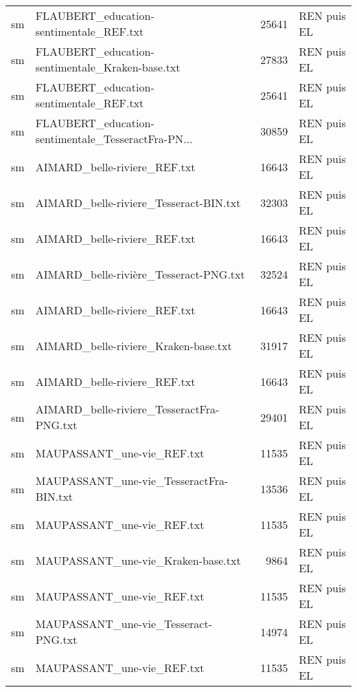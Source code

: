 \begin{tabular}{llrl}
    sm &            FLAUBERT\_education-sentimentale\_REF.txt &                 25641 & REN puis EL \\
    sm &    FLAUBERT\_education-sentimentale\_Kraken-base.txt &                 27833 & REN puis EL \\
    sm &            FLAUBERT\_education-sentimentale\_REF.txt &                 25641 & REN puis EL \\
    sm & FLAUBERT\_education-sentimentale\_TesseractFra-PN... &                 30859 & REN puis EL \\
    sm &                       AIMARD\_belle-riviere\_REF.txt &                 16643 & REN puis EL \\
    sm &             AIMARD\_belle-riviere\_Tesseract-BIN.txt &                 32303 & REN puis EL \\
    sm &                       AIMARD\_belle-riviere\_REF.txt &                 16643 & REN puis EL \\
    sm &             AIMARD\_belle-rivière\_Tesseract-PNG.txt &                 32524 & REN puis EL \\
    sm &                       AIMARD\_belle-riviere\_REF.txt &                 16643 & REN puis EL \\
    sm &               AIMARD\_belle-riviere\_Kraken-base.txt &                 31917 & REN puis EL \\
    sm &                       AIMARD\_belle-riviere\_REF.txt &                 16643 & REN puis EL \\
    sm &          AIMARD\_belle-riviere\_TesseractFra-PNG.txt &                 29401 & REN puis EL \\
    sm &                         MAUPASSANT\_une-vie\_REF.txt &                 11535 & REN puis EL \\
    sm &            MAUPASSANT\_une-vie\_TesseractFra-BIN.txt &                 13536 & REN puis EL \\
    sm &                         MAUPASSANT\_une-vie\_REF.txt &                 11535 & REN puis EL \\
    sm &                 MAUPASSANT\_une-vie\_Kraken-base.txt &                  9864 & REN puis EL \\
    sm &                         MAUPASSANT\_une-vie\_REF.txt &                 11535 & REN puis EL \\
    sm &               MAUPASSANT\_une-vie\_Tesseract-PNG.txt &                 14974 & REN puis EL \\
    sm &                         MAUPASSANT\_une-vie\_REF.txt &                 11535 & REN puis EL \\

\end{tabular}
